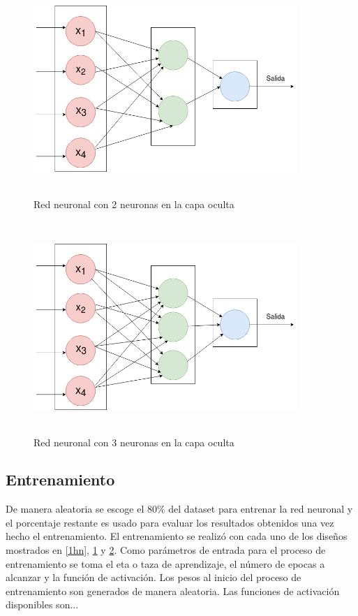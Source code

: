 \documentclass[11pt]{article}
\begin{document}
\begin{figure}[h]
    \includegraphics[width=10cm, height=8cm]{2hn}
    \centering
    \caption{Red neuronal con 2 neuronas en la capa oculta}
    \label{2hn}
\end{figure}
\begin{figure}[h]
    \includegraphics[width=10cm, height=8cm]{3hn}
    \centering
    \caption{Red neuronal con 3 neuronas en la capa oculta}
    \label{3hn}
\end{figure}
\subsection{Entrenamiento}
De manera aleatoria se escoge  el 80\% del dataset para entrenar la red neuronal y el porcentaje
restante es usado para evaluar los resultados obtenidos una vez hecho el entrenamiento.
El entrenamiento se realiz\'o con cada uno de los dise\~nos mostrados en \ref{1hn}, \ref{2hn} y \ref{3hn}.
Como par\'ametros de entrada para el proceso de entrenamiento se toma el eta o taza de aprendizaje, el n\'umero de epocas a alcanzar y la funci\'on de activaci\'on.
Los pesos al inicio del proceso de entrenamiento son generados de manera aleatoria. Las funciones de activaci\'on disponibles son...
\end{document}
